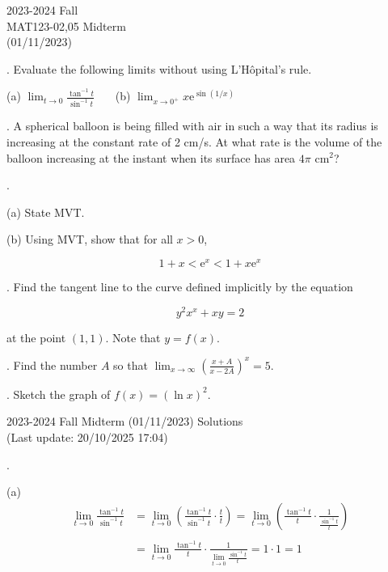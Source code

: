 \documentclass{article}
\begin{document}
\pagestyle{empty}
\large

\begin{center}
2023-2024 Fall \\MAT123-02,05 Midterm\\(01/11/2023)
\end{center}

. Evaluate the following limits without using L'Hôpital's rule.

\hfill

(a) $\displaystyle \lim_{t\to 0} \frac{\tan^{-1} t}{\sin^{-1} t}$ \ \ \ (b) $\displaystyle \lim_{x\to 0^+} x\mathrm{e}^{\displaystyle \sin(1/x)}$

\hfill

. A spherical balloon is being filled with air in such a way that its radius is increasing at the constant rate of 2 cm/s. At what rate is the volume of the balloon increasing at the instant when its surface has area $4\pi$ cm$^2$?

\hfill

.

\hfill

\noindent (a) State MVT.

\hfill

\noindent (b) Using MVT, show that for all $x>0$,

\[1+x<\mathrm{e}^x<1+x\mathrm{e}^x\]

\hfill

. Find the tangent line to the curve defined implicitly by the equation

\[y^2x^x+xy=2\]

\hfill

\noindent at the point $(1,1)$. Note that $y=f(x)$.

\hfill

. Find the number $A$ so that $\displaystyle\lim_{x\to\infty}\left(\frac{x+A}{x-2A}\right)^{x}=5$.

\hfill

. Sketch the graph of $f(x)=(\ln x)^2$.

\newpage

\begin{center}
2023-2024 Fall Midterm (01/11/2023) Solutions\\
(Last update: 20/10/2025 17:04)
\end{center}

.

\hfill

\noindent (a)
\begin{align*}
\lim_{t\to 0} \frac{\tan^{-1} t}{\sin^{-1} t}&= \lim_{t\to 0}\left( \frac{\tan^{-1} t}{\sin^{-1}t} \cdot\frac tt\right) = \lim_{t\to 0}\left( \frac{\tan^{-1} t}{t} \cdot\frac1{\frac {\sin^{-1}t}t}\right)\\\\&=\lim_{t\to0}\frac{\tan^{-1}t}t\cdot\frac1{\displaystyle\lim_{t\to 0}\frac{\sin^{-1}t}t}=1\cdot1=\boxed1
\end{align*}
\end{document}
